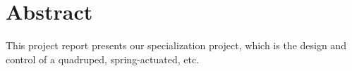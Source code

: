 \section*{Abstract}

This project report presents our specialization project, which is the design and control of a quadruped, spring-actuated, etc.